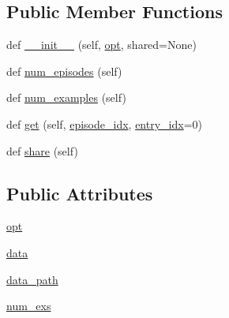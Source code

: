 \subsection*{Public Member Functions}
\begin{DoxyCompactItemize}
\item 
def \hyperlink{classparlai_1_1tasks_1_1wizard__of__wikipedia_1_1agents_1_1WizardOfWikipediaTeacher_a364b2b8db4fd8162bd72d29fe4001d90}{\+\_\+\+\_\+init\+\_\+\+\_\+} (self, \hyperlink{classparlai_1_1tasks_1_1wizard__of__wikipedia_1_1agents_1_1WizardOfWikipediaTeacher_a5d97ef38a8c6e7df29724122f5b9ff72}{opt}, shared=None)
\item 
def \hyperlink{classparlai_1_1tasks_1_1wizard__of__wikipedia_1_1agents_1_1WizardOfWikipediaTeacher_aaf24cfe4f6e58a7d9d8bda076759f76d}{num\+\_\+episodes} (self)
\item 
def \hyperlink{classparlai_1_1tasks_1_1wizard__of__wikipedia_1_1agents_1_1WizardOfWikipediaTeacher_afcede137a01b56b211aa5792346b0560}{num\+\_\+examples} (self)
\item 
def \hyperlink{classparlai_1_1tasks_1_1wizard__of__wikipedia_1_1agents_1_1WizardOfWikipediaTeacher_acf1161101f1d7d03017da25f976488d6}{get} (self, \hyperlink{classparlai_1_1core_1_1teachers_1_1FixedDialogTeacher_afd4ebab8063eb42d182d30a1a41f133e}{episode\+\_\+idx}, \hyperlink{classparlai_1_1core_1_1teachers_1_1FixedDialogTeacher_ae3201b15f3c3b46a2f3511bad9b43e7d}{entry\+\_\+idx}=0)
\item 
def \hyperlink{classparlai_1_1tasks_1_1wizard__of__wikipedia_1_1agents_1_1WizardOfWikipediaTeacher_a8b8691d7d0a5625fe8524811844109fd}{share} (self)
\end{DoxyCompactItemize}
\subsection*{Public Attributes}
\begin{DoxyCompactItemize}
\item 
\hyperlink{classparlai_1_1tasks_1_1wizard__of__wikipedia_1_1agents_1_1WizardOfWikipediaTeacher_a5d97ef38a8c6e7df29724122f5b9ff72}{opt}
\item 
\hyperlink{classparlai_1_1tasks_1_1wizard__of__wikipedia_1_1agents_1_1WizardOfWikipediaTeacher_acb5f4b5a002320ef54a635a90de99960}{data}
\item 
\hyperlink{classparlai_1_1tasks_1_1wizard__of__wikipedia_1_1agents_1_1WizardOfWikipediaTeacher_a9d14d7a5483ecef2808274cee9ec3e3c}{data\+\_\+path}
\item 
\hyperlink{classparlai_1_1tasks_1_1wizard__of__wikipedia_1_1agents_1_1WizardOfWikipediaTeacher_aebe787bd5fe4b9786187a8aecc3a3817}{num\+\_\+exs}
\end{DoxyCompactItemize}


